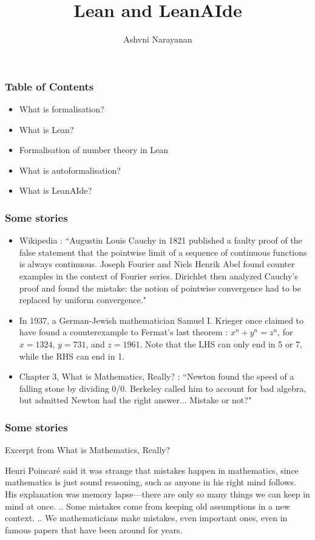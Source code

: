 \documentclass{beamer} %
\title{Lean and LeanAIde}
\author{Ashvni Narayanan}
\institute{Sydney Mathematical Research Institute}
\begin{document}
\frame{\titlepage}

\begin{frame}
\frametitle{Table of Contents}\pause
\begin{itemize}
\item[\textbullet] What is formalisation? \pause
\item[\textbullet] What is Lean? \pause
\item[\textbullet] Formalisation of number theory in Lean \pause
\item[\textbullet] What is autoformalisation? \pause
\item[\textbullet] What is LeanAIde? \pause
\end{itemize}
\end{frame}

\begin{frame}
\frametitle{Some stories}
\begin{itemize}
    \item [\textbullet] Wikipedia : ``Augustin Louis Cauchy in 1821 published a faulty proof of the false statement that the pointwise limit of a sequence of continuous functions is always continuous. Joseph Fourier and Niels Henrik Abel found counter examples in the context of Fourier series. Dirichlet then analyzed Cauchy's proof and found the mistake: the notion of pointwise convergence had to be replaced by uniform convergence." \pause
    \item [\textbullet] In 1937, a German-Jewish mathematician Samuel I. Krieger once claimed to have found a counterexample to Fermat's last theorem : $x^n + y^n = z^n$, for $x = 1324$, $y = 731$, and $z = 1961$. Note that the LHS can only end in 5 or 7, while the RHS can end in 1. \pause
    \item [\textbullet] Chapter 3, What is Mathematics, Really? : ``Newton found the speed of a falling stone by dividing 0/0. Berkeley called him to account for bad algebra, but admitted Newton had the right answer... Mistake or not?"
\end{itemize}
\end{frame}
\begin{frame}
\frametitle{Some stories}
Excerpt from What is Mathematics, Really? \pause
\begin{center}
Henri Poincaré said it was strange that mistakes happen in mathematics, since mathematics is just sound reasoning, such as anyone in his right mind follows. His explanation was memory lapse—there are only so many things we can keep in mind at once. .. \pause Some mistakes come from keeping old assumptions in a new context. .. \pause We mathematicians make mistakes, even important ones, even in famous papers that have been around for years.
\end{center}
\end{frame}
\end{document}
